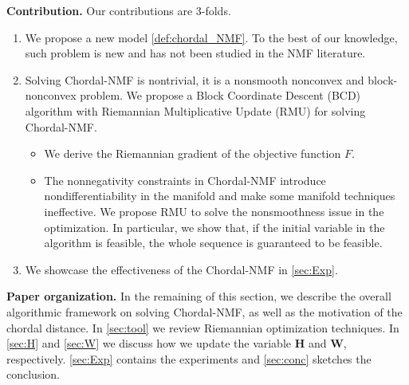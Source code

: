 \documentclass[sn-mathphys-num]{sn-jnl}
\def\H {\bm{H}}
\def\W {\bm{W}}
\begin{document}
\noindent\textbf{Contribution.}
Our contributions are 3-folds.
\begin{enumerate}
\item We propose a new model \eqref{def:chordal_NMF}.
To the best of our knowledge, such problem is new and has not been studied in the NMF literature.

\item Solving Chordal-NMF is nontrivial, it is a nonsmooth nonconvex and block-nonconvex problem.
We propose a Block Coordinate Descent (BCD) algorithm with Riemannian Multiplicative Update (RMU) for solving Chordal-NMF.

\begin{itemize}
    \item We derive the Riemannian gradient of the objective function $F$.
    \item The nonnegativity constraints in Chordal-NMF introduce nondifferentiability in the manifold and make some manifold techniques ineffective.
    We propose RMU to solve the nonsmoothness issue in the optimization.
    In particular, we show that, if the initial variable in the algorithm is feasible, the whole sequence is guaranteed to be feasible.
\end{itemize}

\item We showcase the effectiveness of the Chordal-NMF in \textsection\ref{sec:Exp}.

\end{enumerate}



















\noindent\textbf{Paper organization.}
In the remaining of this section, we describe the overall algorithmic framework on solving Chordal-NMF, as well as the motivation of the chordal distance.
In \textsection\ref{sec:tool} we review Riemannian optimization techniques.
In \textsection\ref{sec:H} and \textsection\ref{sec:W} we discuss how we update the variable $\H$ and $\W$, respectively.
\textsection\ref{sec:Exp} contains the experiments and \textsection\ref{sec:conc} sketches the conclusion.
\\
 
\end{document}
